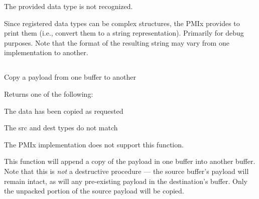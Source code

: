 \returnstart
\begin{constantdesc}
\item {} The provided data type is not recognized.
\end{constantdesc}
\returnend

\descr

Since registered data types can be complex structures, the \ac{PMIx} provides  to print them (i.e., convert them to a string representation). Primarily for debug purposes.  Note that the format of the resulting string may vary from one implementation to another.


\subsection{}

\summary

Copy a payload from one buffer to another

\format


\begin{arglist}
\end{arglist}

Returns one of the following:
\begin{constantdesc}
\item {} The data has been copied as requested
\item {} The src and dest  types do not match
\item {} The \ac{PMIx} implementation does not support this function.
\end{constantdesc}

\descr

This function will append a copy of the payload in one buffer into another buffer. Note that this is \textit{not} a destructive procedure --- the source buffer's payload will remain intact, as will any pre-existing payload in the destination's buffer. Only the unpacked portion of the source payload will be copied.

